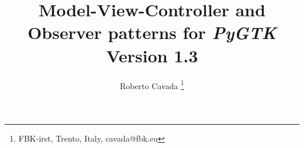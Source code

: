 \documentclass{article}
\newcommand{\appl}[1]{\textsl{#1}\xspace}
\newcommand{\pygtk}{\appl{PyGTK}}
\begin{document}
\title{Model-View-Controller and Observer patterns for \pygtk \\
Version 1.3}

\author{ Roberto Cavada \thanks{FBK-irst, Trento, Italy,
 cavada@fbk.eu} }

\maketitle

\tableofcontents

\newpage



\newpage


\newpage


\newpage


\newpage


\newpage


\newpage


\newpage

\end{document}
